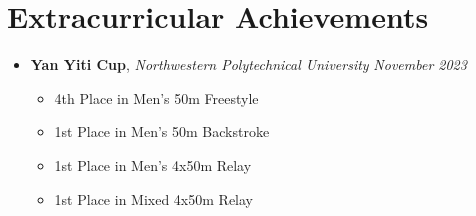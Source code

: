 \documentclass[a4paper,10pt]{article}
\begin{document}
\section*{Extracurricular Achievements}
\begin{itemize}[leftmargin=0.5cm]
    \item \textbf{Yan Yiti Cup}, \textit{Northwestern Polytechnical University} \hfill \textit{November 2023} 
    \begin{itemize}
        \item 4th Place in Men's 50m Freestyle
        \item 1st Place in Men's 50m Backstroke
        \item 1st Place in Men's 4x50m Relay
        \item 1st Place in Mixed 4x50m Relay
    \end{itemize}
\end{itemize}
\end{document}
